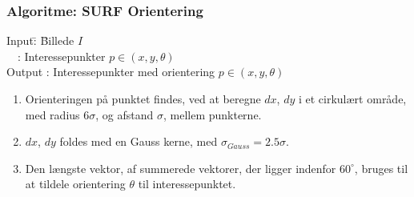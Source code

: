 \subsubsection*{Algoritme: SURF Orientering}
\begin{tabbing}
Input\quad \= : \= Billede $I$\\
$\text{ }$ \> : \>  Interessepunkter $p \in (x, y, \theta)$ \\
Output \text{ } \> : \> Interessepunkter med orientering $p \in (x, y, \theta)$
\end{tabbing}
\begin{enumerate}
\item Orienteringen på punktet findes, ved at beregne $dx$, $dy$ i et cirkulært område, med radius $6\sigma$, og afstand $\sigma$, mellem punkterne. 
\item $dx$, $dy$ foldes med en Gauss kerne, med $\sigma_{Gauss} = 2.5\sigma $.
\item Den længste vektor, af summerede vektorer, der ligger indenfor $60^{\circ}$, bruges til at tildele orientering $\theta$ til interessepunktet.
\end{enumerate}